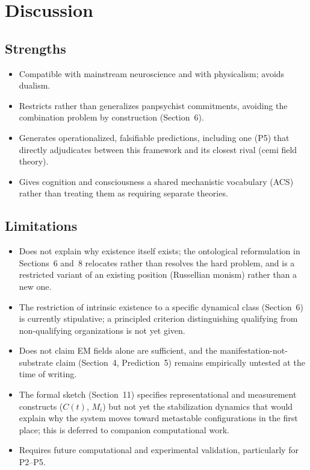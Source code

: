 \documentclass[11pt]{article}
\begin{document}
\section{Discussion}

\subsection*{Strengths}
\begin{itemize}[nosep]
  \item Compatible with mainstream neuroscience and with physicalism; avoids dualism.
  \item Restricts rather than generalizes panpsychist commitments, avoiding the combination problem by construction (Section~6).
  \item Generates operationalized, falsifiable predictions, including one (P5) that directly adjudicates between this framework and its closest rival (cemi field theory).
  \item Gives cognition and consciousness a shared mechanistic vocabulary (ACS) rather than treating them as requiring separate theories.
\end{itemize}

\subsection*{Limitations}
\begin{itemize}[nosep]
  \item Does not explain why existence itself exists; the ontological reformulation in Sections~6 and~8 relocates rather than resolves the hard problem, and is a restricted variant of an existing position (Russellian monism) rather than a new one.
  \item The restriction of intrinsic existence to a specific dynamical class (Section~6) is currently stipulative; a principled criterion distinguishing qualifying from non-qualifying organizations is not yet given.
  \item Does not claim EM fields alone are sufficient, and the manifestation-not-substrate claim (Section~4, Prediction~5) remains empirically untested at the time of writing.
  \item The formal sketch (Section~11) specifies representational and measurement constructs ($C(t)$, $M_i$) but not yet the stabilization dynamics that would explain why the system moves toward metastable configurations in the first place; this is deferred to companion computational work.
  \item Requires future computational and experimental validation, particularly for P2--P5.
\end{itemize}
\end{document}
